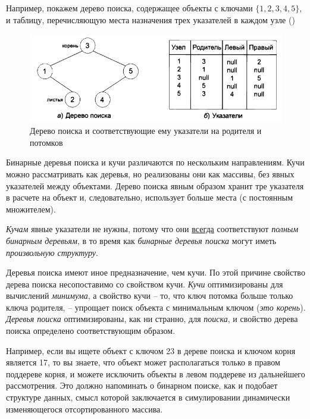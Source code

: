 \documentclass[%
	11pt,
	a4paper,
	utf8,
		]{article}
\begin{document}
Например, покажем дерево поиска, содержащее объекты с ключами $ \{ 1, 2, 3, 4, 5 \} $, и таблицу, перечисляющую места назначения трех указателей в каждом узле ()

\begin{figure}[h]
	\centering
	\includegraphics[scale=0.85]{figures/tree_search_schema2.png}
	\caption{ Дерево поиска и соответствующие ему указатели на родителя и потомков }\label{fig:tree_search_schema2}
\end{figure}

Бинарные деревья поиска и кучи различаются по нескольким направлениям. Кучи можно рассматривать как деревья, но реализованы они как массивы, без явных указателей между объектами. Дерево поиска явным образом хранит тре указателя в расчете на объект и, следовательно, использует больше места (с постоянным множителем).

\emph{\color{blue}Кучам} явные указатели не нужны, потому что они \underline{\color{blue}всегда} соответствуют \emph{\color{blue}полным бинарным деревьям}, в то время как \emph{бинарные деревья поиска} могут иметь \emph{произвольную структуру}.

Деревья поиска имеют иное предназначение, чем кучи. По этой причине свойство дерева поиска несопоставимо со свойством кучи. \emph{Кучи} оптимизированы для вычислений \emph{минимума}, а свойство кучи -- то, что ключ потомка больше только ключа родителя, -- упрощает поиск объекта с минимальным ключом (\emph{это корень}). \emph{\color{blue}Деревья поиска} оптимизированы, как ни странно, для \emph{\color{blue}поиска}, и свойство дерева поиска определено соответствующим образом.

Например, если вы ищете объект с ключом 23 в дереве поиска и ключом корня является 17, то вы знаете, что объект может располагаться только в правом поддереве корня, и можете исключить объекты в левом поддереве из дальнейшего рассмотрения. Это должно напоминать о бинарном поиске, как и подобает структуре данных, смысл которой заключается в симулировании динамически изменяющегося отсортированного массива.
\end{document}
